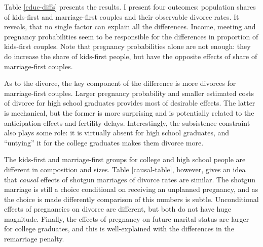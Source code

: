 \documentclass[12pt,letter]{article}
\begin{document}
Table \ref{educ-diffs} presents the results. I present four outcomes: population shares of kids-first and marriage-first couples and their observable divorce rates. It reveals, that no single factor can explain all the differences. Income, meeting and pregnancy probabilities seem to be responsible for the differences in proportion of kids-first couples. Note that pregnancy probabilities alone are not enough: they do increase the share of kids-first people, but have the opposite effects of share of marriage-first couples. 

As to the divorce, the key component of the difference is more divorces for marriage-first couples. Larger pregnancy probability and smaller estimated costs of divorce for high school graduates provides most of desirable effects. The latter is mechanical, but the former is more surprising and is potentially related to the anticipation effects and fertility delays. Interestingly, the subsistence constraint also plays some role: it is virtually absent for high school graduates, and ``untying'' it for the college graduates makes them divorce more.


The kids-first and marriage-first groups for college and high school people are different in composition and sizes. Table \ref{causal-table}, however, gives an idea that \emph{causal} effects of shotgun marriages of divorce rates are similar. The shotgun marriage is still a choice conditional on receiving an unplanned pregnancy, and as the choice is made differently comparison of this numbers is subtle. Unconditional effects of pregnancies on divorce are different, but both do not have huge magnitude. Finally, the effects of pregnancy on future marital status are larger for college graduates, and this is well-explained with the differences in the remarriage penalty. 
\end{document}
